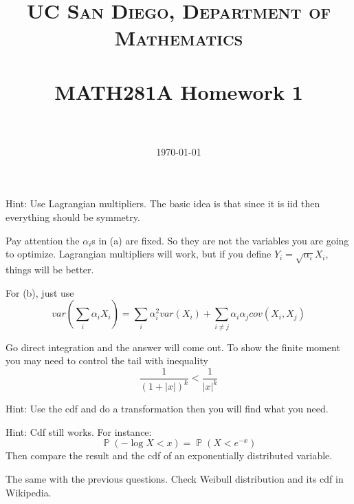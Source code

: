 \documentclass[paper=a4, fontsize=11pt]{scrartcl} %
\title{	
\normalfont \normalsize 
\textsc{UC San Diego, Department of Mathematics} \\ [25pt] %
\horrule{0.5pt} \\[0.4cm] %
\huge MATH281A Homework 1 \\ %
\horrule{2pt} \\[0.5cm] %
}
\date{\normalsize\today} %
\newenvironment{exercise}[2][Exercise]{\begin{trivlist}
\item[\hskip \labelsep {\bfseries #1}\hskip \labelsep {\bfseries #2.}]}{\end{trivlist}}
\numberwithin{equation}{section} %
\numberwithin{figure}{section} %
\numberwithin{table}{section} %
\renewcommand{\P}{\operatorname{\mathbb{P}}}
\begin{document}
\maketitle



\begin{exercise}{1.1.2} 
\end{exercise}

Hint: Use Lagrangian multipliers. The basic idea is that since it is iid then everything should be symmetry. 

\begin{exercise}{1.1.3} 
\end{exercise}

Pay attention the $\alpha_i$s in (a) are fixed. So they are not the variables you are going to optimize. Lagrangian multipliers will work, but if you define $Y_i = \sqrt{\alpha_i} X_i$, things will be better.

For (b), just use
$$
var (\sum_i \alpha_i X_i) = \sum_i \alpha^2_i var(X_i) + \sum_{i \neq j} \alpha_i \alpha_j cov(X_i,X_j)
$$

\begin{exercise}{1.1.12} 
\end{exercise}

Go direct integration and the answer will come out. To show the finite moment you may need to control the tail with inequality
$$
\frac{1}{(1+|x|)^k} < \frac{1}{|x|^k}
$$

\begin{exercise}{1.4.1} 
\end{exercise}

Hint: Use the cdf and do a transformation then you will find what you need.

\begin{exercise}{1.4.2} 
\end{exercise}

Hint: Cdf still works. For instance:
$$
\P (-\log X < x) = \P ( X < e^{-x}) 
$$
Then compare the result and the cdf of an exponentially distributed variable.

\begin{exercise}{1.4.13b} 
\end{exercise}

The same with the previous questions. Check Weibull distribution and its cdf in Wikipedia.

\begin{exercise}{class.1} 
\end{exercise}
\end{document}
